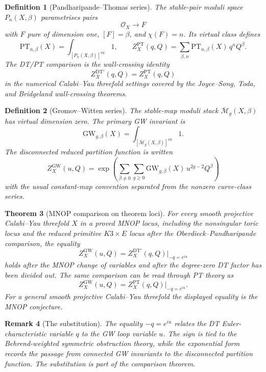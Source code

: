 \documentclass[11pt]{article}
\newtheorem{theorem}{Theorem}
\newtheorem{definition}[theorem]{Definition}
\newtheorem{remark}[theorem]{Remark}
\providecommand{\cO}{\mathcal{O}}
\providecommand{\cM}{\mathcal{M}}
\providecommand{\DT}{\mathrm{DT}}
\providecommand{\GW}{\mathrm{GW}}
\providecommand{\PT}{\mathrm{PT}}
\providecommand{\vir}{\mathrm{vir}}
\begin{document}
\begin{definition}[Pandharipande--Thomas series]
The stable-pair moduli space \(P_n(X,\beta)\) parametrises pairs
\[
  \cO_X \longrightarrow F
\]
with \(F\) pure of dimension one, \([F]=\beta\), and
\(\chi(F)=n\).  Its virtual class defines
\[
  \PT_{n,\beta}(X)
  =
  \int_{[P_n(X,\beta)]^{\vir}}1,
  \qquad
  Z_X^{\PT}(q,Q)
  =
  \sum_{\beta,n}\PT_{n,\beta}(X)\,q^n Q^\beta .
\]
The DT/PT comparison is the wall-crossing identity
\[
  Z_X^{\DT\prime}(q,Q)=Z_X^{\PT}(q,Q)
\]
in the numerical Calabi--Yau threefold settings covered by the
Joyce--Song, Toda, and Bridgeland wall-crossing theorems.
\end{definition}

\begin{definition}[Gromov--Witten series]
The stable-map moduli stack \(\overline{\cM}_g(X,\beta)\) has virtual
dimension zero.  The primary GW invariant is
\[
  \GW_{g,\beta}(X)
  =
  \int_{[\overline{\cM}_g(X,\beta)]^{\vir}}1 .
\]
The disconnected reduced partition function is written
\[
  Z_X^{\GW}(u,Q)
  =
  \exp\!\left(
    \sum_{\beta\neq 0}\sum_{g\geq 0}
      \GW_{g,\beta}(X)\,u^{2g-2}Q^\beta
  \right)
\]
with the usual constant-map convention separated from the nonzero
curve-class series.
\end{definition}

\begin{theorem}[MNOP comparison on theorem loci]
For every smooth projective Calabi--Yau threefold \(X\) in a proved
MNOP locus, including the nonsingular toric locus and the reduced
primitive \(K3\times E\) locus after the Oberdieck--Pandharipande
comparison, the equality
\[
  Z_X^{\GW}(u,Q)
  =
  Z_X^{\DT\prime}(q,Q)\big|_{-q=e^{iu}}
\]
holds after the MNOP change of variables and after the degree-zero DT
factor has been divided out.  The same comparison can be read through
PT theory as
\[
  Z_X^{\GW}(u,Q)
  =
  Z_X^{\PT}(q,Q)\big|_{-q=e^{iu}}.
\]
For a general smooth projective Calabi--Yau threefold the displayed
equality is the MNOP conjecture.
\end{theorem}

\begin{remark}[The substitution]
The equality \(-q=e^{iu}\) relates the DT Euler-characteristic
variable \(q\) to the GW loop variable \(u\).  The sign is tied to the
Behrend-weighted symmetric obstruction theory, while the exponential
form records the passage from connected GW invariants to the
disconnected partition function.  The substitution is part of the
comparison theorem.
\end{remark}
\end{document}
